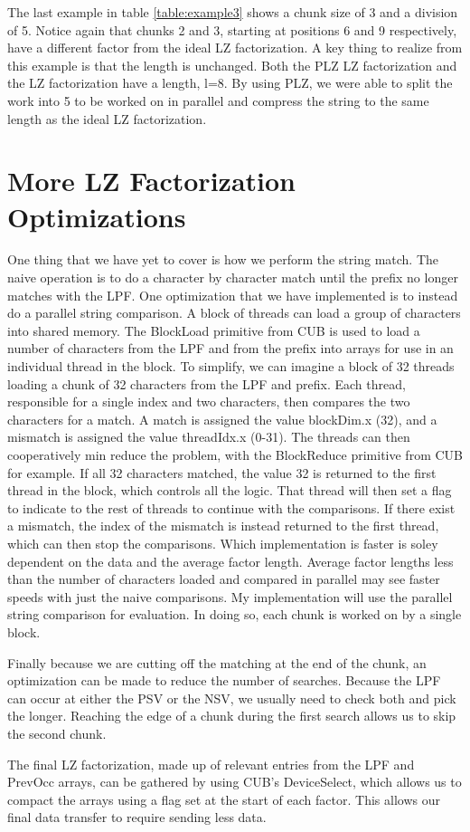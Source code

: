 The last example in table \ref{table:example3} shows a chunk size of 3 and a division of 5.
Notice again that chunks 2 and 3, starting at positions 6 and 9 respectively, have a different factor from the ideal LZ factorization.
A key thing to realize from this example is that the length is unchanged.
Both the PLZ LZ factorization and the LZ factorization have a length, l=8.
By using PLZ, we were able to split the work into 5 to be worked on in parallel and compress the string to the same length as the ideal LZ factorization.

\section{More LZ Factorization Optimizations}

One thing that we have yet to cover is how we perform the string match.
The naive operation is to do a character by character match until the prefix no longer matches with the LPF.
One optimization that we have implemented is to instead do a parallel string comparison.
A block of threads can load a group of characters into shared memory.
The BlockLoad primitive from CUB is used to load a number of characters from the LPF and from the prefix into arrays for use in an individual thread in the block.
To simplify, we can imagine a block of 32 threads loading a chunk of 32 characters from the LPF and prefix.
Each thread, responsible for a single index and two characters, then compares the two characters for a match.
A match is assigned the value blockDim.x (32), and a mismatch is assigned the value threadIdx.x (0-31).
The threads can then cooperatively min reduce the problem, with the BlockReduce primitive from CUB for example.
If all 32 characters matched, the value 32 is returned to the first thread in the block, which controls all the logic.
That thread will then set a flag to indicate to the rest of threads to continue with the comparisons.
If there exist a mismatch, the index of the mismatch is instead returned to the first thread, which can then stop the comparisons.
Which implementation is faster is soley dependent on the data and the average factor length.
Average factor lengths less than the number of characters loaded and compared in parallel may see faster speeds with just the naive comparisons.
My implementation will use the parallel string comparison for evaluation.
In doing so, each chunk is worked on by a single block.

Finally because we are cutting off the matching at the end of the chunk, an optimization can be made to reduce the number of searches.
Because the LPF can occur at either the PSV or the NSV, we usually need to check both and pick the longer. 
Reaching the edge of a chunk during the first search allows us to skip the second chunk.

The final LZ factorization, made up of relevant entries from the LPF and PrevOcc arrays, can be gathered by using CUB's DeviceSelect, which allows us to compact the arrays using a flag set at the start of each factor.
This allows our final data transfer to require sending less data.
